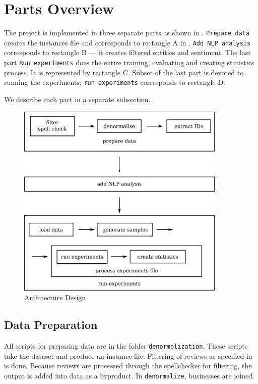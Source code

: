\section{Parts Overview}

The project is implemented in three separate parts as shown in .
\texttt{Prepare data} creates the instances file and corresponds to rectangle A in .
\texttt{Add NLP analysis} corresponds to rectangle B --- it creates filtered entities and sentiment.
The last part \texttt{Run experiments} does the entire training, evaluating and creating statistics process.
It is represented by rectangle C.
Subset of the last part is devoted to running the experiments; \texttt{run experiments} corresponds to rectangle D.

We describe each part in a separate subsection.

\begin{figure}[h]
	\centering
	\includegraphics[width=10cm]{figures/arch_process.eps}
	\caption{Architecture Design}\label{fig:arch_process}
\end{figure}


\subsection{Data Preparation} 

All scripts for preparing data are in the folder \texttt{denormalization}.
These scripts take the dataset and produce an instance file.
Filtering of reviews as specified in  is done.
Because reviews are processed through the spellchecker for filtering,
the output is added into data as a byproduct.
In \texttt{denormalize}, businesses are joined.

